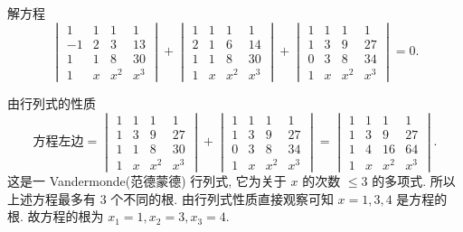 \documentclass[../../main.tex]{subfiles}
\begin{document}
\begin{example}
解方程
\[
\begin{vmatrix} 1 & 1 & 1 & 1 \\ -1 & 2 & 3 & 13 \\ 1 & 1 & 8 & 30 \\ 1 & x & x^2 & x^3 \end{vmatrix} + \begin{vmatrix} 1 & 1 & 1 & 1 \\ 2 & 1 & 6 & 14 \\ 1 & 1 & 8 & 30 \\ 1 & x & x^2 & x^3 \end{vmatrix} + \begin{vmatrix} 1 & 1 & 1 & 1 \\ 1 & 3 & 9 & 27 \\ 0 & 3 & 8 & 34 \\ 1 & x & x^2 & x^3 \end{vmatrix} = 0.
\]
\end{example}
\begin{solution}
由行列式的性质
\[
\text{方程左边} = \begin{vmatrix} 1 & 1 & 1 & 1 \\ 1 & 3 & 9 & 27 \\ 1 & 1 & 8 & 30 \\ 1 & x & x^2 & x^3 \end{vmatrix} + \begin{vmatrix} 1 & 1 & 1 & 1 \\ 1 & 3 & 9 & 27 \\ 0 & 3 & 8 & 34 \\ 1 & x & x^2 & x^3 \end{vmatrix} = \begin{vmatrix} 1 & 1 & 1 & 1 \\ 1 & 3 & 9 & 27 \\ 1 & 4 & 16 & 64 \\ 1 & x & x^2 & x^3 \end{vmatrix}.
\]
这是一 Vandermonde(范德蒙德) 行列式, 它为关于 \(x\) 的次数 \(\leqslant 3\) 的多项式. 所以上述方程最多有 \(3\) 个不同的根. 由行列式性质直接观察可知 \(x = 1, 3, 4\) 是方程的根. 故方程的根为 \(x_1 = 1, x_2 = 3, x_3 = 4\).

\end{solution}
\end{document}
